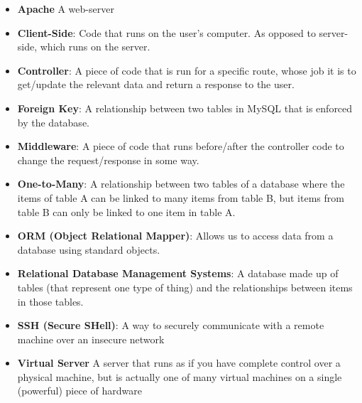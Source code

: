 \begin{itemize}[leftmargin=*]
    \item
        \textbf{Apache}
        A web-server
    \item
        \textbf{Client-Side}:
        Code that runs on the user's computer. As opposed to server-side, which runs on the server.
    \item
        \textbf{Controller}:
        A piece of code that is run for a specific route, whose job it is to get/update the relevant data and return a response to the user.
    \item
        \textbf{Foreign Key}:
        A relationship between two tables in MySQL that is enforced by the database.
    \item
        \textbf{Middleware}:
        A piece of code that runs before/after the controller code to change the request/response in some way.
    \item
        \textbf{One-to-Many}:
        A relationship between two tables of a database where the items of table A can be linked to many items from table B, but items from table B can only be linked to one item in table A.
    \item
        \textbf{ORM (Object Relational Mapper)}:
        Allows us to access data from a database using standard objects.
    \item
        \textbf{Relational Database Management Systems}:
        A database made up of tables (that represent one type of thing) and the relationships between items in those tables.
    \item
        \textbf{SSH (Secure SHell)}:
        A way to securely communicate with a remote machine over an insecure network
    \item
        \textbf{Virtual Server}
        A server that runs as if you have complete control over a physical machine, but is actually one of many virtual machines on a single (powerful) piece of hardware
\end{itemize}
